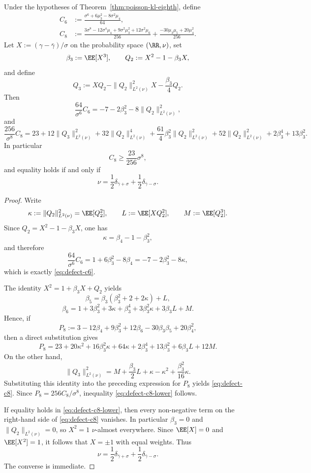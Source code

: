 \begin{theorem}%
\label{thm:poisson-defect-ladder}
Under the hypotheses of Theorem~\ref{thm:poisson-kl-eighth}, define
\begin{align*}
C_6&:=\frac{\sigma^6+6\mu_3^2-8\sigma^2\mu_4}{64}, \\
C_8&:=
\frac{3\sigma^8-12\sigma^4\mu_4+9\sigma^2\mu_3^2+12\sigma^2\mu_6}{256}
+\frac{-30\mu_3\mu_5+20\mu_4^2}{256}.
\end{align*}
Let $X:=(\gamma-\bar\gamma)/\sigma$ on the probability space
$(\RR,\nu)$, set
\[
\beta_3:=\EE[X^3],
\qquad
Q_2:=X^2-1-\beta_3X,
\]
and define
\[
Q_3:=XQ_2-\|Q_2\|_{L^2(\nu)}^2X-\frac{\beta_3}{4}Q_2.
\]
Then
\begin{equation}\label{eq:defect-c6}
\frac{64}{\sigma^6}C_6
=-7-2\beta_3^2-8\|Q_2\|_{L^2(\nu)}^2,
\end{equation}
and
\begin{equation}\label{eq:defect-c8}
\frac{256}{\sigma^8}C_8
=23
+12\|Q_3\|_{L^2(\nu)}^2
+32\|Q_2\|_{L^2(\nu)}^4
+\frac{61}{4}\beta_3^2\|Q_2\|_{L^2(\nu)}^2
+52\|Q_2\|_{L^2(\nu)}^2
+2\beta_3^4
+13\beta_3^2.
\end{equation}
In particular
\begin{equation}\label{eq:defect-c8-lower}
C_8\ge \frac{23}{256}\sigma^8,
\end{equation}
and equality holds if and only if
\[
\nu=\frac12\delta_{\bar\gamma+\sigma}
+\frac12\delta_{\bar\gamma-\sigma}.
\]
\end{theorem}

\begin{proof}
Write
\[
\kappa:=\|Q_2\|_{L^2(\nu)}^2=\EE[Q_2^2],
\qquad
L:=\EE[XQ_2^2],
\qquad
M:=\EE[Q_2^3].
\]
Since $Q_2=X^2-1-\beta_3X$, one has
\[
\kappa=\beta_4-1-\beta_3^2,
\]
and therefore
\[
\frac{64}{\sigma^6}C_6
=1+6\beta_3^2-8\beta_4
=-7-2\beta_3^2-8\kappa,
\]
which is exactly \eqref{eq:defect-c6}.

The identity $X^2=1+\beta_3X+Q_2$ yields
\[
\beta_5=\beta_3(\beta_3^2+2+2\kappa)+L,
\]
\[
\beta_6=1+3\beta_3^2+3\kappa+\beta_3^4+3\beta_3^2\kappa+3\beta_3L+M.
\]
Hence, if
\[
P_8:=3-12\beta_4+9\beta_3^2+12\beta_6-30\beta_3\beta_5+20\beta_4^2,
\]
then a direct substitution gives
\[
P_8
=23+20\kappa^2+16\beta_3^2\kappa+64\kappa+2\beta_3^4+13\beta_3^2+6\beta_3L+12M.
\]
On the other hand,
\[
\|Q_3\|_{L^2(\nu)}^2
=M+\frac{\beta_3}{2}L+\kappa-\kappa^2+\frac{\beta_3^2}{16}\kappa.
\]
Substituting this identity into the preceding expression for $P_8$
yields \eqref{eq:defect-c8}.  Since
$P_8=256C_8/\sigma^8$, inequality \eqref{eq:defect-c8-lower} follows.

If equality holds in \eqref{eq:defect-c8-lower}, then every non-negative
term on the right-hand side of \eqref{eq:defect-c8} vanishes.  In
particular $\beta_3=0$ and $\|Q_2\|_{L^2(\nu)}=0$, so $X^2=1$
$\nu$-almost everywhere.  Since $\EE[X]=0$ and $\EE[X^2]=1$, it follows
that $X=\pm 1$ with equal weights.  Thus
\[
\nu=\frac12\delta_{\bar\gamma+\sigma}
+\frac12\delta_{\bar\gamma-\sigma}.
\]
The converse is immediate.
\end{proof}

